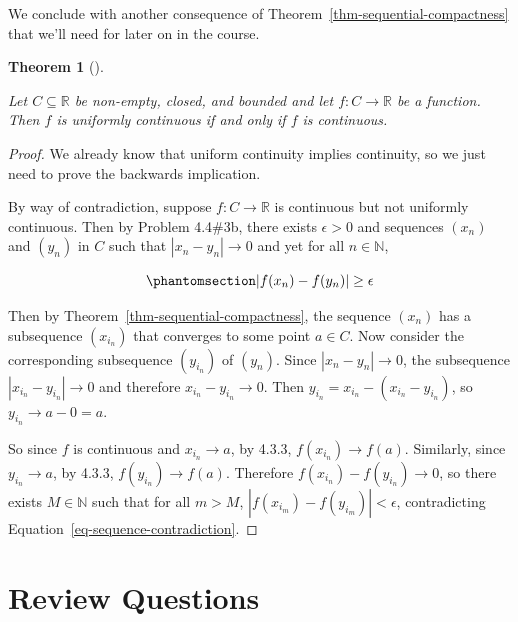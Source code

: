 \documentclass[
  letterpaper,
  DIV=11,
  numbers=noendperiod]{scrreprt}
\def\R{\mathbb R}
\def\N{\mathbb N}
\theoremstyle{plain}
\newtheorem{theorem}{Theorem}[chapter]
\theoremstyle{definition}
\theoremstyle{plain}
\theoremstyle{plain}
\theoremstyle{definition}
\theoremstyle{definition}
\theoremstyle{remark}
\begin{document}
We conclude with another consequence of
Theorem~\ref{thm-sequential-compactness} that we'll need for later on in
the course.

\begin{theorem}[]\protect\hypertarget{thm-cont-on-compact-implies-unif-cont}{}\label{thm-cont-on-compact-implies-unif-cont}

Let \(C\subseteq\R\) be non-empty, closed, and bounded and let
\(f:C\rightarrow\R\) be a function. Then \(f\) is uniformly continuous
if and only if \(f\) is continuous.

\end{theorem}

\begin{proof}
We already know that uniform continuity implies continuity, so we just
need to prove the backwards implication.

By way of contradiction, suppose \(f:C\rightarrow\R\) is continuous but
not uniformly continuous. Then by Problem 4.4\#3b, there exists
\(\epsilon>0\) and sequences \((x_n)\) and \((y_n)\) in \(C\) such that
\(|x_n-y_n|\rightarrow0\) and yet for all \(n\in\N\),

\begin{equation}\phantomsection\label{eq-sequence-contradiction}{
|f(x_n)-f(y_n)|\geq\epsilon 
}\end{equation}

Then by Theorem~\ref{thm-sequential-compactness}, the sequence \((x_n)\)
has a subsequence \((x_{i_n})\) that converges to some point \(a\in C\).
Now consider the corresponding subsequence \((y_{i_n})\) of \((y_n)\).
Since \(|x_n-y_n|\rightarrow0\), the subsequence
\(|x_{i_n}-y_{i_n}|\rightarrow0\) and therefore
\(x_{i_n}-y_{i_n}\rightarrow0\). Then
\(y_{i_n}=x_{i_n}-(x_{i_n}-y_{i_n})\), so \(y_{i_n}\rightarrow a-0=a\).

So since \(f\) is continuous and \(x_{i_n}\rightarrow a\), by 4.3.3,
\(f(x_{i_n})\rightarrow f(a)\). Similarly, since
\(y_{i_n}\rightarrow a\), by 4.3.3, \(f(y_{i_n})\rightarrow f(a)\).
Therefore \(f(x_{i_n})-f(y_{i_n})\rightarrow0\), so there exists
\(M\in\N\) such that for all \(m>M\),
\(|f(x_{i_m})-f(y_{i_m})|<\epsilon\), contradicting
Equation~\ref{eq-sequence-contradiction}.
\end{proof}

\section{Review Questions}\label{review-questions-10}
\end{document}
